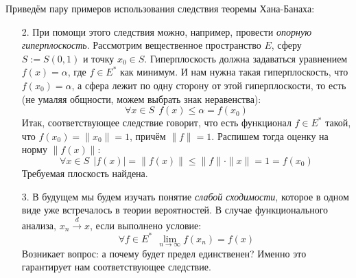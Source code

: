 \begin{example}
	Приведём пару примеров использования следствия теоремы Хана-Банаха:
	\begin{enumerate}
		\item[2.] При помощи этого следствия можно, например, провести \textit{опорную гиперплоскость}. Рассмотрим вещественное пространство $E$, сферу $S := S(0, 1)$ и точку $x_0 \in S$. Гиперплоскость должна задаваться уравнением $f(x) = \alpha$, где $f \in E^*$ как минимум. И нам нужна такая гиперплоскость, что $f(x_0) = \alpha$, а сфера лежит по одну сторону от этой гиперплоскости, то есть (не умаляя общности, можем выбрать знак неравенства):
		\[
			\forall x \in S\ \ f(x) \le \alpha = f(x_0)
		\]
		Итак, соответствующее следствие говорит, что есть функционал $f \in E^*$ такой, что $f(x_0) = \|x_0\| = 1$, причём $\|f\| = 1$. Распишем тогда оценку на норму $\|f(x)\|$:
		\[
			\forall x \in S\ \ |f(x)| = \|f(x)\| \le \|f\| \cdot \|x\| = 1 = f(x_0)
		\]
		Требуемая плоскость найдена.
		
		\item[3.] В будущем мы будем изучать понятие \textit{слабой сходимости}, которое в одном виде уже встречалось в теории вероятностей. В случае функционального анализа, $x_n \xrightarrow{d} x$, если выполнено условие:
		\[
			\forall f \in E^*\ \ \lim_{n \to \infty} f(x_n) = f(x)
		\]
		Возникает вопрос: а почему будет предел единственен? Именно это гарантирует нам соответствующее следствие.
	\end{enumerate}
\end{example}